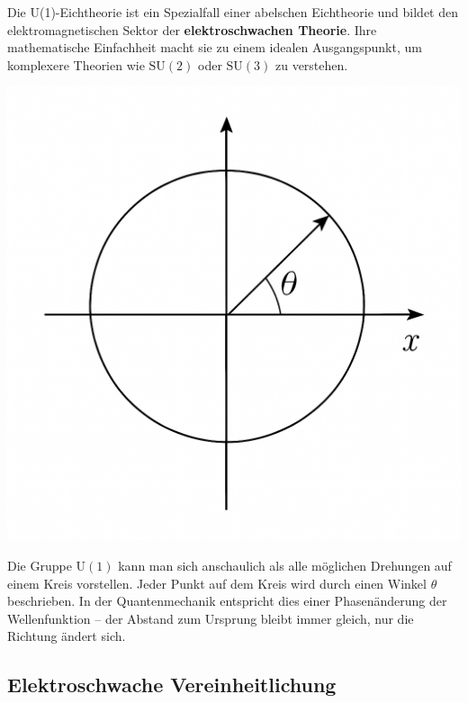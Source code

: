 Die U(1)-Eichtheorie ist ein Spezialfall einer abelschen Eichtheorie und bildet den elektromagnetischen Sektor der \textbf{elektroschwachen Theorie}.  
Ihre mathematische Einfachheit macht sie zu einem idealen Ausgangspunkt, um komplexere Theorien wie \(\mathrm{SU(2)}\) oder \(\mathrm{SU(3)}\) zu verstehen.
\vspace{1em}
\begin{tcolorbox}[didaktikbox, title=U(1) anschaulich erklärt]
	\label{box:u1_kreis}
	\small
	\begin{minipage}{0.35\textwidth}
		\centering
		\includegraphics[width=\linewidth]{bilder/u1_kreis.png}
	\end{minipage}%
	\begin{minipage}{0.63\textwidth}
		Die Gruppe \(\mathrm{U(1)}\) kann man sich anschaulich als alle möglichen
		Drehungen auf einem Kreis vorstellen.  
		Jeder Punkt auf dem Kreis wird durch einen Winkel \(\theta\) beschrieben.  
		In der Quantenmechanik entspricht dies einer Phasenänderung der Wellenfunktion
		– der Abstand zum Ursprung bleibt immer gleich, nur die Richtung ändert sich.
	\end{minipage}
\end{tcolorbox}

\subsection{Elektroschwache Vereinheitlichung}


